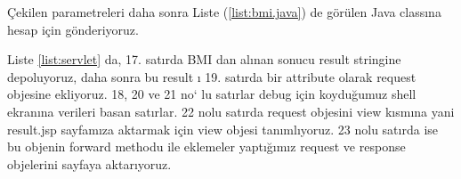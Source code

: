 
Çekilen parametreleri daha sonra Liste (\ref{list:bmi.java}) de görülen Java classına hesap için gönderiyoruz. 



Liste \ref{list:servlet} da, 17. satırda BMI dan alınan sonucu result stringine depoluyoruz, daha sonra bu result ı 19. satırda bir attribute olarak request objesine ekliyoruz. 18, 20 ve 21 no` lu satırlar debug için koyduğumuz shell ekranına verileri basan satırlar. 22 nolu satırda request objesini view kısmına yani result.jsp sayfamıza aktarmak için view objesi tanımlıyoruz. 23 nolu satırda ise bu objenin forward methodu ile eklemeler yaptığımız request ve response objelerini sayfaya aktarıyoruz.



